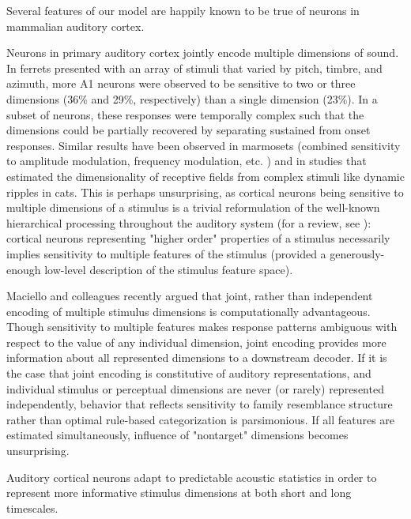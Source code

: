 Several features of our model are happily known to be true of neurons in mammalian auditory cortex. 

Neurons in primary auditory cortex jointly encode multiple dimensions of sound\cite{kingRecentAdvancesUnderstanding2018a}. In ferrets presented with an array of stimuli that varied by pitch, timbre, and azimuth\cite{bizleyInterdependentEncodingPitch2009b}, more A1 neurons were observed to be sensitive to two or three dimensions (36\% and 29\%, respectively) than a single dimension (23\%). In a subset of neurons, these responses were temporally complex such that the dimensions could be partially recovered by separating sustained from onset responses\cite{walkerMultiplexedRobustRepresentations2011}. Similar results have been observed in marmosets (combined sensitivity to amplitude modulation, frequency modulation, etc. \cite{Wang2005a}) and in studies that estimated the dimensionality of receptive fields from complex stimuli like dynamic ripples in cats\cite{atencioMultidimensionalReceptiveField2017}. This is perhaps unsurprising, as cortical neurons being sensitive to multiple dimensions of a stimulus is a trivial reformulation of the well-known hierarchical processing throughout the auditory system (for a review, see \cite{sharpeeHierarchicalRepresentationsAuditory2011b}): cortical neurons representing "higher order" properties of a stimulus necessarily implies sensitivity to multiple features of the stimulus (provided a generously-enough low-level description of the stimulus feature space).

Maciello and colleagues recently argued that joint, rather than independent encoding of multiple stimulus dimensions is computationally advantageous\cite{macellaioWhySensoryNeurons2020}. Though sensitivity to multiple features makes response patterns ambiguous with respect to the value of any individual dimension, joint encoding provides more information about all represented dimensions to a downstream decoder. If it is the case that joint encoding is constitutive of auditory representations, and individual stimulus or perceptual dimensions are never (or rarely) represented independently, behavior that reflects sensitivity to family resemblance structure rather than optimal rule-based categorization is parsimonious. If all features are estimated simultaneously, influence of "nontarget" dimensions becomes unsurprising. 

Auditory cortical neurons adapt to predictable acoustic statistics in order to represent more informative stimulus dimensions at both short and long timescales. 

